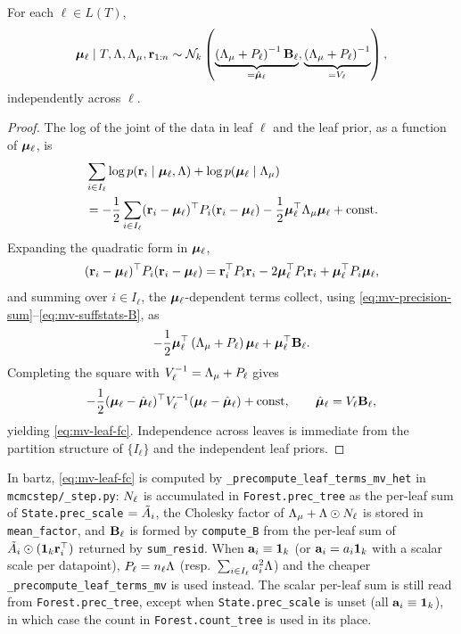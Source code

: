 \begin{prop}
	\label{prop:mv-leaf}
	For each $\ell \in L(T)$,
	\begin{equation}
		\label{eq:mv-leaf-fc}
		\bm{\mu}_\ell \mid T, \Lambda, \Lambda_{\mu}, \mathbf{r}_{1:n} \sim
		\mathcal{N}_k\left(
		\underbrace{\left(\Lambda_{\mu} + P_\ell\right)^{-1} \mathbf{B}_\ell}_{= \hat{\bm{\mu}}_\ell},
		\underbrace{\left(\Lambda_{\mu} + P_\ell\right)^{-1}}_{= V_\ell}
		\right),
	\end{equation}
	independently across $\ell$.
\end{prop}

\begin{proof}
	The log of the joint of the data in leaf $\ell$ and the leaf prior, as a
	function of $\bm{\mu}_\ell$, is
	\begin{align}
		 & \sum_{i\in I_\ell}\log p(\mathbf{r}_i \mid \bm{\mu}_\ell, \Lambda)
		+ \log p(\bm{\mu}_\ell \mid \Lambda_{\mu})                          \\
		 & = -\frac{1}{2}\sum_{i\in I_\ell}
		(\mathbf{r}_i - \bm{\mu}_\ell)^\top P_i (\mathbf{r}_i - \bm{\mu}_\ell)
		-\frac{1}{2}\bm{\mu}_\ell^\top \Lambda_{\mu}  \bm{\mu}_\ell + \text{const.}
	\end{align}
	Expanding the quadratic form in $\bm{\mu}_\ell$,
	\begin{equation}
		(\mathbf{r}_i - \bm{\mu}_\ell)^\top P_i (\mathbf{r}_i - \bm{\mu}_\ell)
		= \mathbf{r}_i^\top P_i \mathbf{r}_i - 2 \bm{\mu}_\ell^\top P_i \mathbf{r}_i
		+ \bm{\mu}_\ell^\top P_i \bm{\mu}_\ell,
	\end{equation}
	and summing over $i \in I_\ell$, the $\bm{\mu}_\ell$-dependent terms collect,
	using \eqref{eq:mv-precision-sum}--\eqref{eq:mv-suffstats-B}, as
	\begin{equation}
		-\frac{1}{2}\bm{\mu}_\ell^\top
		\left(\Lambda_{\mu} + P_\ell\right) \bm{\mu}_\ell
		+ \bm{\mu}_\ell^\top \mathbf{B}_\ell.
	\end{equation}
	Completing the square with $V_\ell^{-1} = \Lambda_{\mu} + P_\ell$ gives
	\begin{equation}
		-\frac{1}{2}(\bm{\mu}_\ell - \hat{\bm{\mu}}_\ell)^\top V_\ell^{-1}
		(\bm{\mu}_\ell - \hat{\bm{\mu}}_\ell) + \text{const},
		\qquad \hat{\bm{\mu}}_\ell = V_\ell \mathbf{B}_\ell,
	\end{equation}
	yielding \eqref{eq:mv-leaf-fc}. Independence across leaves is immediate
	from the partition structure of $\{I_\ell\}$ and the independent leaf
	priors.
\end{proof}

In bartz, \eqref{eq:mv-leaf-fc} is computed by
\texttt{\_precompute\_leaf\_terms\_mv\_het} in \texttt{mcmcstep/\_step.py}:
$N_\ell$ is accumulated in \texttt{Forest.prec\_tree} as the per-leaf sum
of \texttt{State.prec\_scale} $= \tilde{A}_i$, the Cholesky factor of
$\Lambda_{\mu} + \Lambda \odot N_\ell$ is stored in \texttt{mean\_factor}, and
$\mathbf{B}_\ell$ is formed by \texttt{compute\_B} from the per-leaf sum of
$\tilde{A}_i \odot (\mathbf{1}_k\mathbf{r}_i^\top)$ returned by \texttt{sum\_resid}. When
$\mathbf{a}_i \equiv \mathbf{1}_k$ (or $\mathbf{a}_i = a_i\mathbf{1}_k$ with a scalar scale per
datapoint), $P_\ell = n_\ell \Lambda$ (resp.\ $\sum_{i\in I_\ell} a_i^2 \Lambda$)
and the cheaper \texttt{\_precompute\_leaf\_terms\_mv} is used instead. The
scalar per-leaf sum is still read from \texttt{Forest.prec\_tree}, except when
\texttt{State.prec\_scale} is unset (all $\mathbf{a}_i \equiv \mathbf{1}_k$), in which case
the count in \texttt{Forest.count\_tree} is used in its place.

